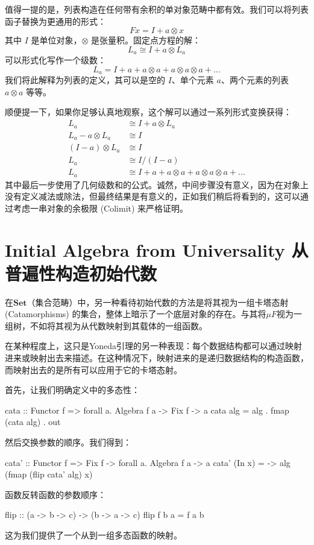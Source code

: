 \documentclass[DaoFP]{subfiles}
\begin{document}
 值得一提的是，列表构造在任何带有余积的单对象范畴中都有效。我们可以将列表函子替换为更通用的形式：
 \[ F x = I + a \otimes x \]
 其中 $I$ 是单位对象，$\otimes$ 是张量积。固定点方程的解：
 \[ L_a \cong I + a \otimes L_a \]
 可以形式化写作一个级数：
 \[ L_a = I + a + a \otimes a + a \otimes a \otimes a + ... \]
 我们将此解释为列表的定义，其可以是空的 $I$、单个元素 $a$、两个元素的列表 $a \otimes a$ 等等。

 顺便提一下，如果你足够认真地观察，这个解可以通过一系列形式变换获得：
 \begin{align*}
  L_a &\cong I + a \otimes L_a
  \\
  L_a - a \otimes L_a &\cong I
  \\
  (I - a) \otimes L_a &\cong I
  \\
  L_a &\cong I / (I - a)
  \\
  L_a &\cong I + a + a \otimes a + a \otimes a \otimes a + ...
 \end{align*}
 其中最后一步使用了几何级数和的公式。诚然，中间步骤没有意义，因为在对象上没有定义减法或除法，但最终结果是有意义的，正如我们稍后将看到的，这可以通过考虑一串对象的余极限 (Colimit) 来严格证明。

 \section{Initial Algebra from Universality 从普遍性构造初始代数}

 在$\mathbf{Set}$（集合范畴）中，另一种看待初始代数的方法是将其视为一组卡塔态射 (Catamorphisms) 的集合，整体上暗示了一个底层对象的存在。与其将$\mu F$视为一组树，不如将其视为从代数映射到其载体的一组函数。

 在某种程度上，这只是Yoneda引理的另一种表现：每个数据结构都可以通过映射进来或映射出去来描述。在这种情况下，映射进来的是递归数据结构的构造函数，而映射出去的是所有可以应用于它的卡塔态射。

 首先，让我们明确定义中的多态性：
 \begin{haskell}
  cata :: Functor f => forall a. Algebra f a -> Fix f -> a
  cata alg = alg . fmap (cata alg) . out
 \end{haskell}
 然后交换参数的顺序。我们得到：
 \begin{haskell}
  cata' :: Functor f => Fix f -> forall a. Algebra f a -> a
  cata' (In x) = \alg -> alg (fmap (flip cata' alg) x)
 \end{haskell}
 函数反转函数的参数顺序：
 \begin{haskell}
  flip :: (a -> b -> c) -> (b -> a -> c)
  flip f b a = f a b
 \end{haskell}
 这为我们提供了一个从到一组多态函数的映射。
\end{document}
